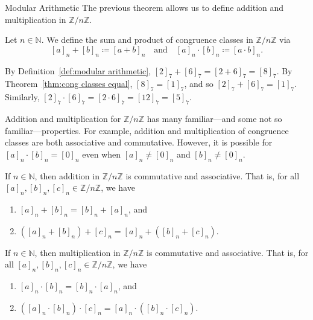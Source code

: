 \begin{section}{Modular Arithmetic}
The previous theorem allows us to define addition and multiplication in $\mathbb{Z}/n\mathbb{Z}$. 

\begin{definition}\label{def:modular arithmetic}
Let $n\in \mathbb{N}$. We define the sum and product of congruence classes in $\mathbb{Z}/n\mathbb{Z}$ via
\[
[a]_n + [b]_n\coloneqq [a+b]_n \quad \text{and} \quad [a]_n \cdot [b]_n\coloneqq [a\cdot b]_n.
\]
\end{definition}

\begin{example}
By Definition~\ref{def:modular arithmetic}, $[2]_7+[6]_7 = [2+6]_7 = [8]_7$. By Theorem~\ref{thm:cong classes equal}, $[8]_7 = [1]_7$, and so $[2]_7+[6]_7 = [1]_7$. Similarly, $[2]_7\cdot[6]_7 = [2\cdot6]_7 = [12]_7 = [5]_7$.
\end{example}

Addition and multiplication for $\mathbb{Z}/n\mathbb{Z}$ has many familiar---and some not so familiar---properties. For example, addition and multiplication of congruence classes are both associative and commutative. However, it is possible for $[a]_n\cdot[b]_n = [0]_n$ even when $[a]_n \neq [0]_n$ and $[b]_n \neq [0]_n$.

\begin{theorem}\label{thm:modular add comm assoc}
If $n\in \mathbb{N}$, then addition in $\mathbb{Z}/n\mathbb{Z}$ is commutative and associative. That is, for all $[a]_n, [b]_n, [c]_n \in \mathbb{Z}/n\mathbb{Z}$, we have
\begin{enumerate}[label=\textrm{(\alph*)}]
\item $[a]_n + [b]_n = [b]_n + [a]_n$, and
\item\label{modular add assoc} $([a]_n + [b]_n) + [c]_n = [a]_n + ([b]_n + [c]_n)$. 
\end{enumerate}
\end{theorem}

\begin{theorem}\label{thm:modular mult comm assoc}
If $n\in \mathbb{N}$, then multiplication in $\mathbb{Z}/n\mathbb{Z}$ is commutative and associative. That is, for all $[a]_n, [b]_n, [c]_n \in \mathbb{Z}/n\mathbb{Z}$, we have
\begin{enumerate}[label=\textrm{(\alph*)}]
\item $[a]_n \cdot [b]_n = [b]_n \cdot [a]_n$, and
\item\label{modular mult assoc} $([a]_n \cdot [b]_n) \cdot [c]_n = [a]_n \cdot ([b]_n \cdot [c]_n)$.
\end{enumerate}
\end{theorem}


\end{section}
